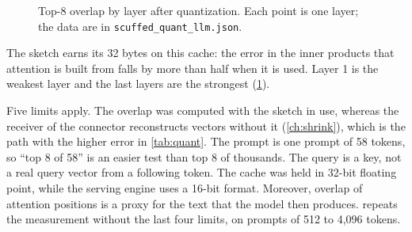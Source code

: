 \begin{figure}[htbp]
  \centering
  \caption[Top-8 overlap by layer after quantization]{Top-8 overlap by layer after quantization. Each point is one layer; the data are in \nolinkurl{scuffed_quant_llm.json}.}
  \label{fig:quant-layers}
\end{figure}

The sketch earns its 32 bytes on this cache: the error in the inner products
that attention is built from falls by more than half when it is used. Layer 1
is the weakest layer and the last layers are the strongest
(\cref{fig:quant-layers}).

Five limits apply. The overlap was computed with the sketch in use, whereas
the receiver of the connector reconstructs vectors without it
(\cref{ch:shrink}), which is the path with the higher error in
\cref{tab:quant}. The prompt is one prompt of 58 tokens, so ``top 8 of 58''
is an easier test than top 8 of thousands. The query is a key, not a real
query vector from a following token. The cache was held in 32-bit floating
point, while the serving engine uses a 16-bit format. Moreover, overlap of
attention positions is a proxy for the text that the model then produces.
 repeats the measurement without the last four
limits, on prompts of 512 to 4,096 tokens.


